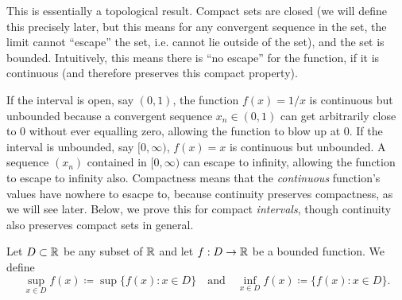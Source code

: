 \documentclass[../analysis1.tex]{subfiles}
\begin{document}
\begin{remark}
    This is essentially a topological result. Compact sets are closed (we will define this precisely later, but this means for any convergent sequence in the set, the limit cannot ``escape'' the set, i.e. cannot lie outside of the set), and the set is bounded. Intuitively, this means there is ``no escape'' for the function, if it is continuous (and therefore preserves this compact property).\par
    If the interval is open, say $(0, 1)$, the function $f(x) = 1/x$ is continuous but unbounded because a convergent sequence $x_n\in (0,1)$ can get arbitrarily close to 0 without ever equalling zero, allowing the function to blow up at 0. If the interval is unbounded, say $[0, \infty)$, $f(x) = x$ is continuous but unbounded. A sequence $(x_n)$ contained in $[0,\infty)$ can escape to infinity, allowing the function to escape to infinity also.
    Compactness means that the \textit{continuous} function's values have nowhere to esacpe to, because continuity preserves compactness, as we will see later. Below, we prove this for compact \textit{intervals}, though continuity also preserves compact sets in general.
\end{remark}

\begin{definition}
    \begin{shaded*}
        Let $D\subset\mathbb{R}$ be any subset of $\mathbb{R}$ and let $f:D\to\mathbb{R}$ be a bounded function. We define
        \[\sup_{x\in D}f(x)\coloneqq \sup\{f(x):x\in D\}\quad\text{and}\quad\inf_{x\in D}f(x)\coloneqq\{f(x):x\in D\}.\]
    \end{shaded*}
\end{definition}
\end{document}
